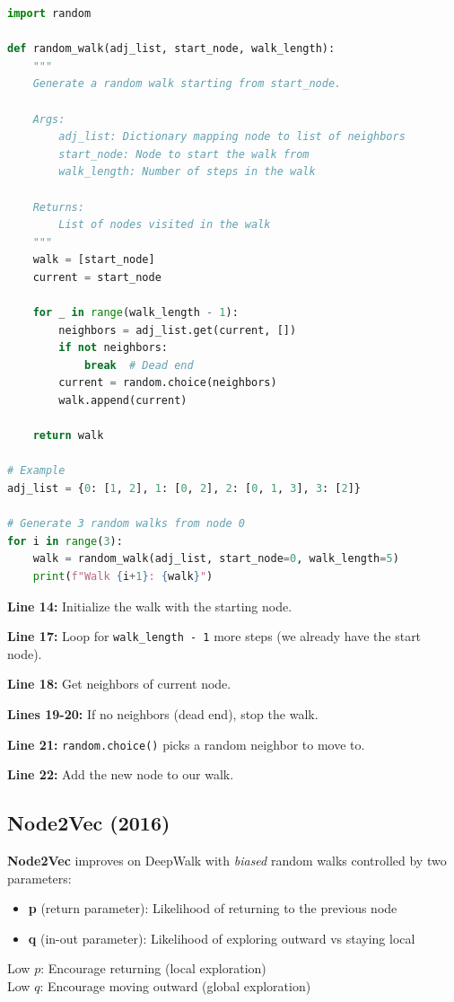 \documentclass[12pt,a4paper]{article}
\begin{document}
\begin{lstlisting}[language=Python,caption={Random walk generation}]
import random

def random_walk(adj_list, start_node, walk_length):
    """
    Generate a random walk starting from start_node.

    Args:
        adj_list: Dictionary mapping node to list of neighbors
        start_node: Node to start the walk from
        walk_length: Number of steps in the walk

    Returns:
        List of nodes visited in the walk
    """
    walk = [start_node]
    current = start_node

    for _ in range(walk_length - 1):
        neighbors = adj_list.get(current, [])
        if not neighbors:
            break  # Dead end
        current = random.choice(neighbors)
        walk.append(current)

    return walk

# Example
adj_list = {0: [1, 2], 1: [0, 2], 2: [0, 1, 3], 3: [2]}

# Generate 3 random walks from node 0
for i in range(3):
    walk = random_walk(adj_list, start_node=0, walk_length=5)
    print(f"Walk {i+1}: {walk}")
\end{lstlisting}

\begin{explanation}
\textbf{Line 14:} Initialize the walk with the starting node.

\textbf{Line 17:} Loop for \texttt{walk\_length - 1} more steps (we already have the start node).

\textbf{Line 18:} Get neighbors of current node.

\textbf{Lines 19-20:} If no neighbors (dead end), stop the walk.

\textbf{Line 21:} \texttt{random.choice()} picks a random neighbor to move to.

\textbf{Line 22:} Add the new node to our walk.
\end{explanation}

\subsection{Node2Vec (2016)}

\begin{concept}
\textbf{Node2Vec} improves on DeepWalk with \textit{biased} random walks controlled by two parameters:
\begin{itemize}
    \item \textbf{p} (return parameter): Likelihood of returning to the previous node
    \item \textbf{q} (in-out parameter): Likelihood of exploring outward vs staying local
\end{itemize}

Low $p$: Encourage returning (local exploration)\\
Low $q$: Encourage moving outward (global exploration)
\end{concept}
\end{document}
